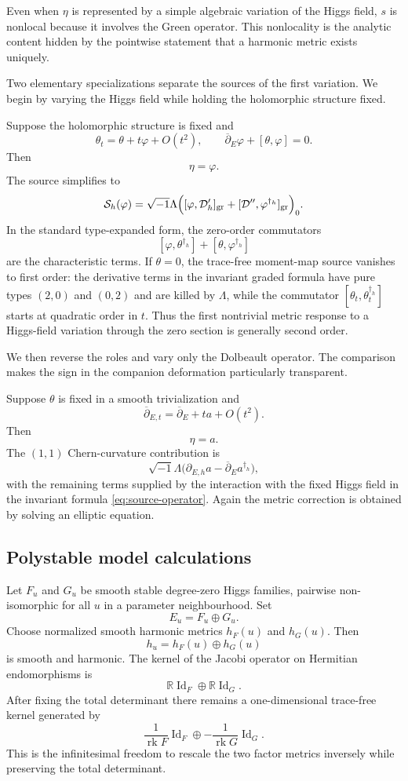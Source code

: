\documentclass[11pt,reqno]{amsart}
\theoremstyle{definition}
\theoremstyle{remark}
\newcommand{\R}{\mathbb R}
\newcommand{\cD}{\mathcal D}
\newcommand{\cS}{\mathcal S}
\newcommand{\Id}{\operatorname{Id}}
\newcommand{\rk}{\operatorname{rk}}
\newcommand{\ddbar}{\overline\partial}
\begin{document}
Even when $\eta$ is represented by a simple algebraic variation of the Higgs field, $s$ is nonlocal because it involves the Green operator.  This nonlocality is the analytic content hidden by the pointwise statement that a harmonic metric exists uniquely.


Two elementary specializations separate the sources of the first variation.  We begin by varying the Higgs field while holding the holomorphic structure fixed.


Suppose the holomorphic structure is fixed and
\[
  \theta_t=\theta+t\varphi+O(t^2),
  \qquad
  \ddbar_E\varphi+[\theta,\varphi]=0.
\]
Then
\[
  \eta=\varphi.
\]
The source simplifies to
\begin{equation}\label{eq:higgs-only-source}
  \cS_h(\varphi)
  =\sqrt{-1}\Lambda\Bigl(
  [\varphi,\cD'_h]_{\mathrm{gr}}
  +[\cD'',\varphi^{\dagger_h}]_{\mathrm{gr}}
  \Bigr)_0.
\end{equation}
In the standard type-expanded form, the zero-order commutators
\[
  [\varphi,\theta^{\dagger_h}]
  +[\theta,\varphi^{\dagger_h}]
\]
are the characteristic terms.  If $\theta=0$, the trace-free moment-map source vanishes to first order: the derivative terms in the invariant graded formula have pure types $(2,0)$ and $(0,2)$ and are killed by $\Lambda$, while the commutator $[\theta_t,\theta_t^{\dagger_h}]$ starts at quadratic order in $t$.  Thus the first nontrivial metric response to a Higgs-field variation through the zero section is generally second order.


We then reverse the roles and vary only the Dolbeault operator.  The comparison makes the sign in the companion deformation particularly transparent.


Suppose $\theta$ is fixed in a smooth trivialization and
\[
  \ddbar_{E,t}=\ddbar_E+ta+O(t^2).
\]
Then
\[
  \eta=a.
\]
The $(1,1)$ Chern-curvature contribution is
\[
  \sqrt{-1}\Lambda\bigl(
  \partial_{E,h}a-\ddbar_Ea^{\dagger_h}
  \bigr),
\]
with the remaining terms supplied by the interaction with the fixed Higgs field in the invariant formula \eqref{eq:source-operator}.  Again the metric correction is obtained by solving an elliptic equation.

\subsection{Polystable model calculations}

Let $F_u$ and $G_u$ be smooth stable degree-zero Higgs families, pairwise non-isomorphic for all $u$ in a parameter neighbourhood.  Set
\[
  E_u=F_u\oplus G_u.
\]
Choose normalized smooth harmonic metrics $h_F(u)$ and $h_G(u)$.  Then
\[
  h_u=h_F(u)\oplus h_G(u)
\]
is smooth and harmonic.  The kernel of the Jacobi operator on Hermitian endomorphisms is
\[
  \R\Id_F\oplus\R\Id_G.
\]
After fixing the total determinant there remains a one-dimensional trace-free kernel generated by
\[
  \frac1{\rk F}\Id_F
  \oplus
  -\frac1{\rk G}\Id_G.
\]
This is the infinitesimal freedom to rescale the two factor metrics inversely while preserving the total determinant.
\end{document}
